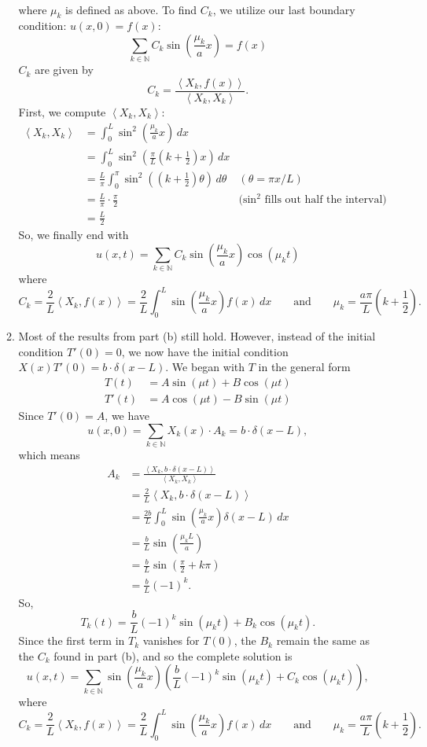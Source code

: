 \documentclass[10pt,letterpaper]{report}
\newcommand{\N}{\mathbb{N}}
\newcommand{\ip}[2]{\left\langle{#1},{#2}\right\rangle}
\begin{document}
\begin{enumerate}
\begin{enumerate}
\begin{align*}
\end{align*}
where $\mu_k$ is defined as above. To find $C_k$, we utilize our last boundary condition: $u(x, 0) = f(x):$
\[
\sum_{k \in \N} C_k \sin\left(\frac{\mu_k}{a}x\right) = f(x)
\]
$C_k$ are given by
\[
C_k = \frac{\ip{X_k}{f(x)}}{\ip{X_k}{X_k}}.
\]
First, we compute $\ip{X_k}{X_k}:$
\begin{align*}
    \ip{X_k}{X_k} &= \int_0^L \sin^2\left(\frac{\mu_k}{a}x\right)\,dx \\
    &= \int_0^L \sin^2\left(\frac{\pi }{L}\left(k + \frac{1}{2}\right)x\right)\,dx \\
    &=
    \frac{L}{\pi}\int_0^{\pi} \sin^2\left(\left(k + \frac{1}{2}\right)\theta\right)\,d\theta &(\theta = \pi x / L)
    \\
    &=
    \frac{L}{\pi} \cdot \frac{\pi}{2} &\textrm{($\sin^2$ fills out half the interval)} \\
    &= \frac{L}{2}
\end{align*}
So, we finally end with
\[
u(x, t) = \sum_{k \in \N} C_k \sin\left(\frac{\mu_k}{a}x\right)\cos(\mu_k t)
\]
where
\[
C_k = \frac{2}{L}\ip{X_k}{f(x)} = \frac{2}{L}\int_0^L \sin\left(\frac{\mu_k}{a}x\right)f(x)\,dx \qquad \textrm{and} \qquad 
\mu_k = \frac{a \pi}{L}\left(k + \frac{1}{2}\right).
\]

\item Most of the results from part (b) still hold. However, instead of the initial condition $T'(0) = 0$, we now have the initial condition $X(x)T'(0) = b\cdot \delta(x - L)$. We began with $T$ in the general form
\begin{align*}
    T(t) &= A\sin(\mu t) + B\cos(\mu t)
    \\
    T'(t) &= A\cos(\mu t) - B\sin(\mu t)
\end{align*}
Since $T'(0) = A$, we have
\[
u(x, 0) = \sum_{k \in \N} X_k(x)\cdot A_k = b\cdot \delta(x - L),
\]
which means
\begin{align*}
    A_k &= \frac{\ip{X_k}{b\cdot \delta(x - L)}}{\ip{X_k}{X_k}}
    \\
    &= \frac{2}{L}\ip{X_k}{b\cdot \delta(x - L)}
    \\
    &=
    \frac{2b}{L}\int_0^L \sin\left(\frac{\mu_k}{a}x\right)\delta(x - L)\,dx
    \\
    &= \frac{b}{L}\sin\left(\frac{\mu_k L}{a}\right)
    \\
    &= \frac{b}{L}\sin\left(\frac{\pi}{2} + k\pi\right) \\
    &= \frac{b}{L}\left(-1\right)^k.
\end{align*}
So, \[
T_k(t) = \frac{b}{L}\left(-1\right)^k \sin(\mu_k t) + B_k \cos(\mu_k t).
\]
Since the first term in $T_k$ vanishes for $T(0)$, the $B_k$ remain the same as the $C_k$ found in part (b), and so the complete solution is 
\[
u(x, t) = \sum_{k \in \N}\sin\left(\frac{\mu_k}{a}x\right)\left(\frac{b}{L}\left(-1\right)^k \sin(\mu_k t) + C_k \cos(\mu_k t)\right),
\]
where
\[
C_k = \frac{2}{L}\ip{X_k}{f(x)} = \frac{2}{L}\int_0^L \sin\left(\frac{\mu_k}{a}x\right)f(x)\,dx \qquad \textrm{and} \qquad 
\mu_k = \frac{a \pi}{L}\left(k + \frac{1}{2}\right).
\]
\end{enumerate}


\end{enumerate}
\end{document}
